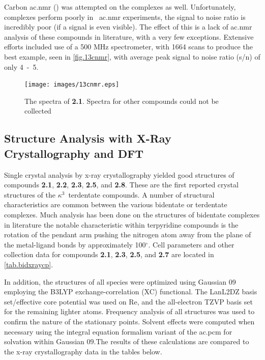 Carbon \gls{ac.nmr} () was attempted on the complexes as well. Unfortunately,  complexes perform poorly in ~\gls{ac.nmr} experiments, the signal to noise ratio is incredibly poor (if a signal is even visible). The effect of this is a lack of  \gls{ac.nmr} analysis of these compounds in literature, with a very few exceptions. Extensive efforts included use of a 500 MHz spectrometer, with 1664 scans to produce the best example, seen in \autoref{fig.13cnmr}, with average peak signal to noise ratio (s/n) of only 4~-~5.

\begin{figure}[!htb]
 \begin{center}
  \texttt{[image: images/13cnmr.eps]}
 \end{center}
\caption[The 13C  spectra of \textbf{2.1}]{The   spectra of \textbf{2.1}. Spectra for other compounds could not be collected}
\label{fig.13cnmr}
\end{figure} 

\FloatBarrier

\subsection{Structure Analysis with X-Ray Crystallography and DFT}\label{ss.xray}

Single crystal analysis by x-ray crystallography yielded good structures of compounds \textbf{2.1}, \textbf{2.2}, \textbf{2.3}, \textbf{2.5}, and \textbf{2.8}. These are the first reported crystal structures of the $\kappa^3$~terdentate  compounds. A number of structural characteristics are common between the various bidentate or terdentate complexes. Much analysis has been done on the structures of bidentate complexes in literature\autocite{anderson1990, civitello1993, kurz2006} the notable characteristic within terpyridine compounds is the rotation of the pendant arm pushing the nitrogen atom away from the plane of the metal-ligand bonds by approximately 100$^\circ$. Cell parameters and other collection data for compounds \textbf{2.1}, \textbf{2.3}, \textbf{2.5}, and \textbf{2.7} are located in \autoref{tab.bidxraycp}.



In addition, the structures of all species were optimized using Gaussian 09\autocite{gaussian} employing the B3LYP\autocite{becke1993, lee1988}  exchange-correlation (XC) functional. The LanL2DZ basis set/effective core potential\autocite{hay1985} was used on Re, and the all-electron TZVP basis set\autocite{schafer1994} for the remaining lighter atoms. Frequency analysis of all structures was used to confirm the nature of the stationary points. Solvent effects were computed when necessary using the integral equation formalism variant of the \gls{ac.pcm} for solvation within Gaussian 09\autocite{tomasi2005, scalmani2006}.The results of these calculations are compared to the x-ray crystallography data in the tables below.


